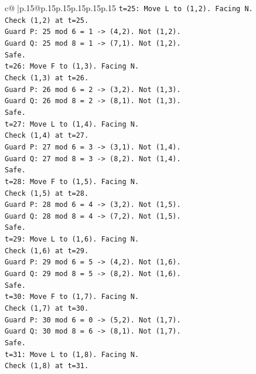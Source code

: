 \documentclass{article}
\begin{document}
{\begin{supertabular}{c@{$\;$}|p{.15\linewidth}@{}p{.15\linewidth}p{.15\linewidth}p{.15\linewidth}p{.15\linewidth}p{.15\linewidth}}
{{{\texttt{t=25: Move L to (1,2). Facing N.} \\
\texttt{Check (1,2) at t=25.} \\
\texttt{Guard P: 25 mod 6 = 1 {-}> (4,2). Not (1,2).} \\
\texttt{Guard Q: 25 mod 8 = 1 {-}> (7,1). Not (1,2).} \\
\texttt{Safe.} \\
\texttt{t=26: Move F to (1,3). Facing N.} \\
\texttt{Check (1,3) at t=26.} \\
\texttt{Guard P: 26 mod 6 = 2 {-}> (3,2). Not (1,3).} \\
\texttt{Guard Q: 26 mod 8 = 2 {-}> (8,1). Not (1,3).} \\
\texttt{Safe.} \\
\texttt{t=27: Move L to (1,4). Facing N.} \\
\texttt{Check (1,4) at t=27.} \\
\texttt{Guard P: 27 mod 6 = 3 {-}> (3,1). Not (1,4).} \\
\texttt{Guard Q: 27 mod 8 = 3 {-}> (8,2). Not (1,4).} \\
\texttt{Safe.} \\
\texttt{t=28: Move F to (1,5). Facing N.} \\
\texttt{Check (1,5) at t=28.} \\
\texttt{Guard P: 28 mod 6 = 4 {-}> (3,2). Not (1,5).} \\
\texttt{Guard Q: 28 mod 8 = 4 {-}> (7,2). Not (1,5).} \\
\texttt{Safe.} \\
\texttt{t=29: Move L to (1,6). Facing N.} \\
\texttt{Check (1,6) at t=29.} \\
\texttt{Guard P: 29 mod 6 = 5 {-}> (4,2). Not (1,6).} \\
\texttt{Guard Q: 29 mod 8 = 5 {-}> (8,2). Not (1,6).} \\
\texttt{Safe.} \\
\texttt{t=30: Move F to (1,7). Facing N.} \\
\texttt{Check (1,7) at t=30.} \\
\texttt{Guard P: 30 mod 6 = 0 {-}> (5,2). Not (1,7).} \\
\texttt{Guard Q: 30 mod 8 = 6 {-}> (8,1). Not (1,7).} \\
\texttt{Safe.} \\
\texttt{t=31: Move L to (1,8). Facing N.} \\
\texttt{Check (1,8) at t=31.} \\
}}}
\end{supertabular}}
\end{document}
